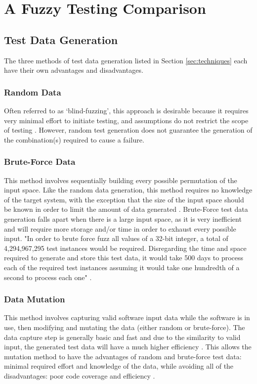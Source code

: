 \documentclass[10pt, final, journal, letterpaper, twoside, twocolumn]{IEEEtran}
\begin{document}
\section{\label{sec:compare}A Fuzzy Testing Comparison}
	\subsection{Test Data Generation}
		The three methods of test data generation listed in Section \ref{sec:techniques} each have their own advantages and disadvantages. 
		
		\subsubsection{\label{sec:random}Random Data}
			Often referred to as `blind-fuzzing', this approach is desirable because it requires very minimal effort to initiate testing, and assumptions do not restrict the scope of testing \cite{clarke}. However, random test generation does not guarantee the generation of the combination(s) required to cause a failure. 
			
		\subsubsection{Brute-Force Data}
			This method involves sequentially building every possible permutation of the input space. Like the random data generation, this method requires no knowledge of the target system, with the exception that the size of the input space should be known in order to limit the amount of data generated \cite{clarke}. Brute-Force test data generation falls apart when there is a large input space, as it is very inefficient and will require more storage and/or time in order to exhaust every possible input. "In order to brute force fuzz all values of a 32-bit integer, a total of 4,294,967,295 test instances would be required. Disregarding the time and space required to generate and store this test data, it would take 500 days to process each of the required test instances assuming it would take one hundredth of a second to process each one" \cite{clarke}.
			
		\subsubsection{Data Mutation}
			This method involves capturing valid software input data while the software is in use, then modifying and mutating the data (either random or brute-force). The data capture step is generally basic and fast and due to the similarity to valid input, the generated test data will have a much higher efficiency \cite{clarke}. This allows the mutation method to have the advantages of random and brute-force test data: minimal required effort and knowledge of the data, while avoiding all of the disadvantages: poor code coverage and efficiency \cite{clarke}. 
	
\end{document}
